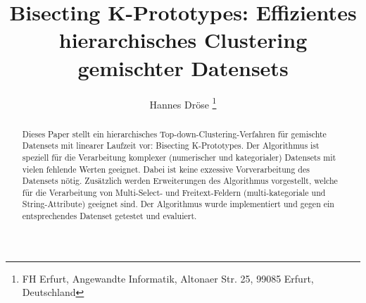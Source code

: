 \documentclass[]{lni}
\begin{document}
\title[Bisecting K-Prototypes]{Bisecting K-Prototypes: Effizientes hierarchisches Clustering gemischter Datensets}
\author[Hannes Dröse]{
    Hannes Dröse
    \footnote{FH Erfurt, Angewandte Informatik, Altonaer Str. 25, 99085 Erfurt, Deutschland
    }
}
\maketitle

\begin{abstract}
    Dieses Paper stellt ein hierarchisches Top-down-Clustering-Verfahren für gemischte Datensets mit linearer Laufzeit vor: Bisecting K-Prototypes. Der Algorithmus ist speziell für die Verarbeitung komplexer (numerischer und kategorialer) Datensets mit vielen fehlende Werten geeignet. Dabei ist keine exzessive Vorverarbeitung des Datensets nötig. Zusätzlich werden Erweiterungen des Algorithmus vorgestellt, welche für die Verarbeitung von Multi-Select- und Freitext-Feldern (multi-kategoriale und String-Attribute) geeignet sind. Der Algorithmus wurde implementiert und gegen ein entsprechendes Datenset getestet und evaluiert.
\end{abstract}




\printbibliography %
\end{document}
